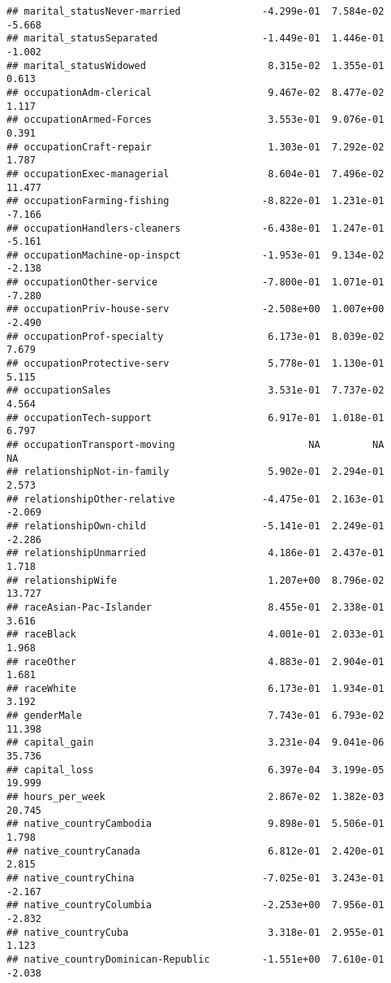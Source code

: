 \documentclass[]{article}
\begin{document}
\begin{verbatim}
## marital_statusNever-married              -4.299e-01  7.584e-02  -5.668
## marital_statusSeparated                  -1.449e-01  1.446e-01  -1.002
## marital_statusWidowed                     8.315e-02  1.355e-01   0.613
## occupationAdm-clerical                    9.467e-02  8.477e-02   1.117
## occupationArmed-Forces                    3.553e-01  9.076e-01   0.391
## occupationCraft-repair                    1.303e-01  7.292e-02   1.787
## occupationExec-managerial                 8.604e-01  7.496e-02  11.477
## occupationFarming-fishing                -8.822e-01  1.231e-01  -7.166
## occupationHandlers-cleaners              -6.438e-01  1.247e-01  -5.161
## occupationMachine-op-inspct              -1.953e-01  9.134e-02  -2.138
## occupationOther-service                  -7.800e-01  1.071e-01  -7.280
## occupationPriv-house-serv                -2.508e+00  1.007e+00  -2.490
## occupationProf-specialty                  6.173e-01  8.039e-02   7.679
## occupationProtective-serv                 5.778e-01  1.130e-01   5.115
## occupationSales                           3.531e-01  7.737e-02   4.564
## occupationTech-support                    6.917e-01  1.018e-01   6.797
## occupationTransport-moving                       NA         NA      NA
## relationshipNot-in-family                 5.902e-01  2.294e-01   2.573
## relationshipOther-relative               -4.475e-01  2.163e-01  -2.069
## relationshipOwn-child                    -5.141e-01  2.249e-01  -2.286
## relationshipUnmarried                     4.186e-01  2.437e-01   1.718
## relationshipWife                          1.207e+00  8.796e-02  13.727
## raceAsian-Pac-Islander                    8.455e-01  2.338e-01   3.616
## raceBlack                                 4.001e-01  2.033e-01   1.968
## raceOther                                 4.883e-01  2.904e-01   1.681
## raceWhite                                 6.173e-01  1.934e-01   3.192
## genderMale                                7.743e-01  6.793e-02  11.398
## capital_gain                              3.231e-04  9.041e-06  35.736
## capital_loss                              6.397e-04  3.199e-05  19.999
## hours_per_week                            2.867e-02  1.382e-03  20.745
## native_countryCambodia                    9.898e-01  5.506e-01   1.798
## native_countryCanada                      6.812e-01  2.420e-01   2.815
## native_countryChina                      -7.025e-01  3.243e-01  -2.167
## native_countryColumbia                   -2.253e+00  7.956e-01  -2.832
## native_countryCuba                        3.318e-01  2.955e-01   1.123
## native_countryDominican-Republic         -1.551e+00  7.610e-01  -2.038

\end{verbatim}
\end{document}
